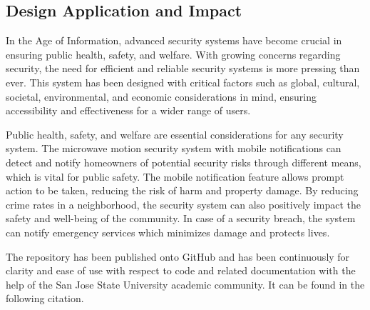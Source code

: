 \subsection{Design Application and Impact}\label{subsec:design-application-and-impact}

In the Age of Information, advanced security systems have become crucial in ensuring public
health, safety, and welfare. With growing concerns regarding security, the need for
efficient and reliable security systems is more pressing than ever. This system has been designed
with critical factors such as global, cultural, societal, environmental, and economic
considerations in mind, ensuring accessibility and effectiveness for a wider range of users.

Public health, safety, and welfare are essential considerations for any security system.
The microwave motion security system with mobile notifications can detect and notify homeowners
of potential security risks through different means, which is vital for public safety.
The mobile notification feature allows prompt action to be taken, reducing the risk of
harm and property damage. By reducing crime rates in a neighborhood, the security system
can also positively impact the safety and well-being of the community. In case of a
security breach, the system can notify emergency services which minimizes damage and protects lives.

The repository has been published onto GitHub and has been continuously for clarity and ease of
use with respect to code and related documentation with the help of the San Jose State
University academic community. It can be found in the following citation. \cite{MorteSense-2023}